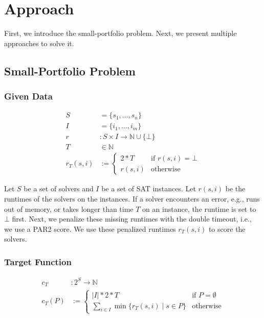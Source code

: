 \documentclass[conference]{IEEEtran}
\begin{document}
\section{Approach}
\label{sec:approach}

First, we introduce the small-portfolio problem.
Next, we present multiple approaches to solve it.

\subsection{Small-Portfolio Problem}

\subsubsection{Given Data}
\label{sec:approach:problem:data}

\begin{align*}
	S &= \{s_1, \dots, s_n\} \tag*{Solvers}\\
	I &= \{i_1, \dots, i_m\} \tag*{Instances}\\
	r &: S \times I \rightarrow \mathbb{N} \cup \{\bot\} \tag*{Runtimes (censored)}\\
	T &\in \mathbb{N} \tag*{Timeout}\\
	r_T(s,i) &:= \begin{cases}
		2*T & \text{if }r(s,i) = \bot\\
		r(s,i) & \text{otherwise}
	\end{cases} \tag*{Penalized Runtimes}
\end{align*}

Let $S$ be a set of solvers and $I$ be a set of SAT instances.
Let $r(s,i)$ be the runtimes of the solvers on the instances.
If a solver encounters an error, e.g., runs out of memory, or takes longer than time $T$ on an instance, the runtime is set to $\bot$ first.
Next, we penalize these missing runtimes with the double timeout, i.e., we use a PAR2 score.
We use these penalized runtimes $r_T(s,i)$ to score the solvers.

\subsubsection{Target Function}
\label{sec:approach:problem:target}

\begin{align*}
	c_{T} &: 2^S \rightarrow \mathbb{N}\\
	c_{T}(P) &:= \begin{cases}
		|I|*2*T & \text{if }P=\emptyset\\
		\sum_{i \in I}{\min\{r_T(s,i) \mid s \in P\}} & \text{otherwise}
	\end{cases} \tag*{Portfolio Cost}
\end{align*}
\end{document}
